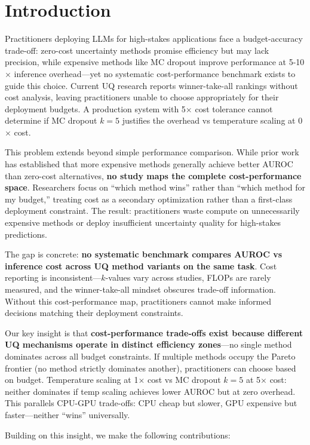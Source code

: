 \section{Introduction}

Practitioners deploying LLMs for high-stakes applications face a budget-accuracy trade-off: zero-cost uncertainty methods promise efficiency but may lack precision, while expensive methods like MC dropout improve performance at 5-10$\times$ inference overhead---yet no systematic cost-performance benchmark exists to guide this choice. Current UQ research reports winner-take-all rankings without cost analysis, leaving practitioners unable to choose appropriately for their deployment budgets. A production system with 5$\times$ cost tolerance cannot determine if MC dropout $k=5$ justifies the overhead vs temperature scaling at 0$\times$ cost.

This problem extends beyond simple performance comparison. While prior work has established that more expensive methods generally achieve better AUROC than zero-cost alternatives, \textbf{no study maps the complete cost-performance space}. Researchers focus on ``which method wins'' rather than ``which method for my budget,'' treating cost as a secondary optimization rather than a first-class deployment constraint. The result: practitioners waste compute on unnecessarily expensive methods or deploy insufficient uncertainty quality for high-stakes predictions.

The gap is concrete: \textbf{no systematic benchmark compares AUROC vs inference cost across UQ method variants on the same task}. Cost reporting is inconsistent---$k$-values vary across studies, FLOPs are rarely measured, and the winner-take-all mindset obscures trade-off information. Without this cost-performance map, practitioners cannot make informed decisions matching their deployment constraints.

Our key insight is that \textbf{cost-performance trade-offs exist because different UQ mechanisms operate in distinct efficiency zones}---no single method dominates across all budget constraints. If multiple methods occupy the Pareto frontier (no method strictly dominates another), practitioners can choose based on budget. Temperature scaling at 1$\times$ cost vs MC dropout $k=5$ at 5$\times$ cost: neither dominates if temp scaling achieves lower AUROC but at zero overhead. This parallels CPU-GPU trade-offs: CPU cheap but slower, GPU expensive but faster---neither ``wins'' universally.

Building on this insight, we make the following contributions:

